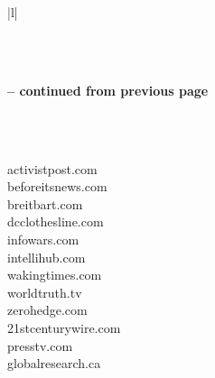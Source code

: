 \documentclass[12pt]{article}
\begin{document}
\begin{center}
\begin{longtable}{|l|}
\caption{Domains that are present in both D1 and D3 (gotten from finalC.csv)} \label{tab:long} \\

\hline {}  \\ \hline 
\endfirsthead

%
{{\bfseries \tablename \thetable{} -- continued from previous page}} \\
\hline  {}  \\ \hline 
\endhead

\hline {} \\ \hline
\endfoot

\hline \hline
\endlastfoot
activistpost.com    \\
beforeitsnews.com   \\
breitbart.com       \\
dcclothesline.com   \\
infowars.com        \\
intellihub.com      \\
wakingtimes.com     \\
worldtruth.tv       \\
zerohedge.com       \\
21stcenturywire.com \\
presstv.com         \\
globalresearch.ca  
\end{longtable}
\end{center}
\end{document}
